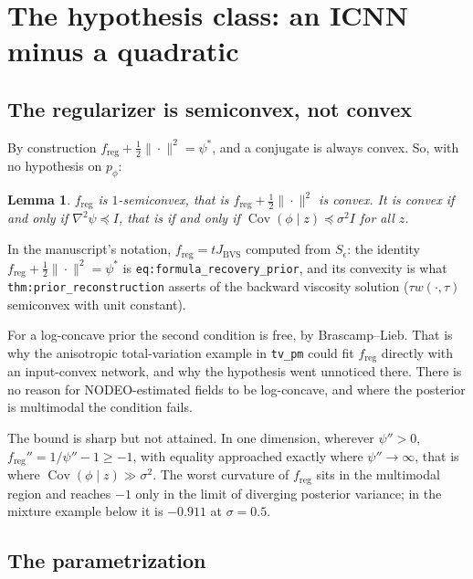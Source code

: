 \documentclass[11pt]{article}
\newtheorem{lemma}[proposition]{Lemma}
\theoremstyle{definition}
\newcommand{\Cov}{\operatorname{Cov}}
\newcommand{\freg}{f_{\mathrm{reg}}}
\newcommand{\code}[1]{\texttt{#1}}
\newcommand{\Jbvs}{J_{\mathrm{BVS}}}
\begin{document}
\section{The hypothesis class: an ICNN minus a quadratic}
\label{sec:class}

\subsection{The regularizer is semiconvex, not convex}

By construction $\freg + \tfrac12\|\cdot\|^2 = \psi^*$, and a conjugate is always convex. So, with no hypothesis on $p_\phi$:

\begin{lemma}
\label{lem:semiconvex}
$\freg$ is $1$-semiconvex, that is $\freg + \tfrac12\|\cdot\|^2$ is convex. It is convex if and only if $\nabla^2\psi\preceq I$, that is if and only if $\Cov(\phi\mid z)\preceq\sigma^2 I$ for all $z$.
\end{lemma}

In the manuscript's notation, $\freg = t\Jbvs$ computed from $S_\epsilon$: the identity $\freg + \tfrac12\|\cdot\|^2 = \psi^*$ is \code{eq:formula\_recovery\_prior}, and its convexity is what \code{thm:prior\_reconstruction} asserts of the backward viscosity solution ($\tau w(\cdot,\tau)$ semiconvex with unit constant).

For a log-concave prior the second condition is free, by Brascamp--Lieb. That is why the anisotropic total-variation example in \code{tv\_pm} could fit $\freg$ directly with an input-convex network, and why the hypothesis went unnoticed there. There is no reason for NODEO-estimated fields to be log-concave, and where the posterior is multimodal the condition fails.

The bound is sharp but not attained. In one dimension, wherever $\psi''>0$, $\freg'' = 1/\psi'' - 1 \ge -1$, with equality approached exactly where $\psi''\to\infty$, that is where $\Cov(\phi\mid z)\gg\sigma^2$. The worst curvature of $\freg$ sits in the multimodal region and reaches $-1$ only in the limit of diverging posterior variance; in the mixture example below it is $-0.911$ at $\sigma = 0.5$.

\subsection{The parametrization}
\end{document}
